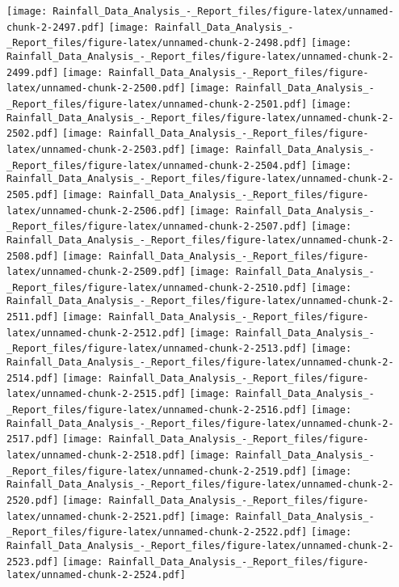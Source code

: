 \documentclass[
]{article}
\begin{document}
\texttt{[image: Rainfall\_Data\_Analysis\_-\_Report\_files/figure-latex/unnamed-chunk-2-2497.pdf]}
\texttt{[image: Rainfall\_Data\_Analysis\_-\_Report\_files/figure-latex/unnamed-chunk-2-2498.pdf]}
\texttt{[image: Rainfall\_Data\_Analysis\_-\_Report\_files/figure-latex/unnamed-chunk-2-2499.pdf]}
\texttt{[image: Rainfall\_Data\_Analysis\_-\_Report\_files/figure-latex/unnamed-chunk-2-2500.pdf]}
\texttt{[image: Rainfall\_Data\_Analysis\_-\_Report\_files/figure-latex/unnamed-chunk-2-2501.pdf]}
\texttt{[image: Rainfall\_Data\_Analysis\_-\_Report\_files/figure-latex/unnamed-chunk-2-2502.pdf]}
\texttt{[image: Rainfall\_Data\_Analysis\_-\_Report\_files/figure-latex/unnamed-chunk-2-2503.pdf]}
\texttt{[image: Rainfall\_Data\_Analysis\_-\_Report\_files/figure-latex/unnamed-chunk-2-2504.pdf]}
\texttt{[image: Rainfall\_Data\_Analysis\_-\_Report\_files/figure-latex/unnamed-chunk-2-2505.pdf]}
\texttt{[image: Rainfall\_Data\_Analysis\_-\_Report\_files/figure-latex/unnamed-chunk-2-2506.pdf]}
\texttt{[image: Rainfall\_Data\_Analysis\_-\_Report\_files/figure-latex/unnamed-chunk-2-2507.pdf]}
\texttt{[image: Rainfall\_Data\_Analysis\_-\_Report\_files/figure-latex/unnamed-chunk-2-2508.pdf]}
\texttt{[image: Rainfall\_Data\_Analysis\_-\_Report\_files/figure-latex/unnamed-chunk-2-2509.pdf]}
\texttt{[image: Rainfall\_Data\_Analysis\_-\_Report\_files/figure-latex/unnamed-chunk-2-2510.pdf]}
\texttt{[image: Rainfall\_Data\_Analysis\_-\_Report\_files/figure-latex/unnamed-chunk-2-2511.pdf]}
\texttt{[image: Rainfall\_Data\_Analysis\_-\_Report\_files/figure-latex/unnamed-chunk-2-2512.pdf]}
\texttt{[image: Rainfall\_Data\_Analysis\_-\_Report\_files/figure-latex/unnamed-chunk-2-2513.pdf]}
\texttt{[image: Rainfall\_Data\_Analysis\_-\_Report\_files/figure-latex/unnamed-chunk-2-2514.pdf]}
\texttt{[image: Rainfall\_Data\_Analysis\_-\_Report\_files/figure-latex/unnamed-chunk-2-2515.pdf]}
\texttt{[image: Rainfall\_Data\_Analysis\_-\_Report\_files/figure-latex/unnamed-chunk-2-2516.pdf]}
\texttt{[image: Rainfall\_Data\_Analysis\_-\_Report\_files/figure-latex/unnamed-chunk-2-2517.pdf]}
\texttt{[image: Rainfall\_Data\_Analysis\_-\_Report\_files/figure-latex/unnamed-chunk-2-2518.pdf]}
\texttt{[image: Rainfall\_Data\_Analysis\_-\_Report\_files/figure-latex/unnamed-chunk-2-2519.pdf]}
\texttt{[image: Rainfall\_Data\_Analysis\_-\_Report\_files/figure-latex/unnamed-chunk-2-2520.pdf]}
\texttt{[image: Rainfall\_Data\_Analysis\_-\_Report\_files/figure-latex/unnamed-chunk-2-2521.pdf]}
\texttt{[image: Rainfall\_Data\_Analysis\_-\_Report\_files/figure-latex/unnamed-chunk-2-2522.pdf]}
\texttt{[image: Rainfall\_Data\_Analysis\_-\_Report\_files/figure-latex/unnamed-chunk-2-2523.pdf]}
\texttt{[image: Rainfall\_Data\_Analysis\_-\_Report\_files/figure-latex/unnamed-chunk-2-2524.pdf]}
\end{document}
